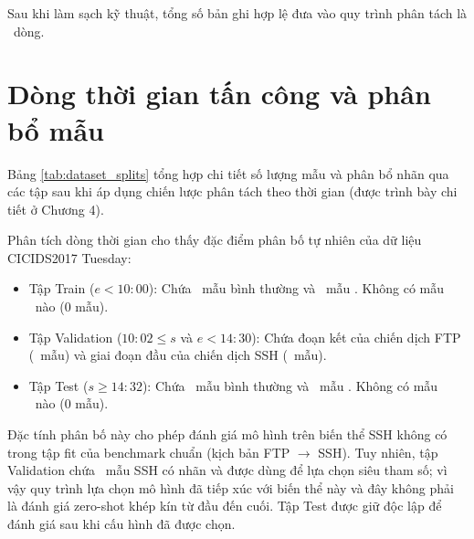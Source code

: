 Sau khi làm sạch kỹ thuật, tổng số bản ghi hợp lệ đưa vào quy trình phân tách là \DataCleanRows\ dòng.

\section{Dòng thời gian tấn công và phân bổ mẫu}

Bảng \ref{tab:dataset_splits} tổng hợp chi tiết số lượng mẫu và phân bổ nhãn qua các tập sau khi áp dụng chiến lược phân tách theo thời gian (được trình bày chi tiết ở Chương 4).



Phân tích dòng thời gian cho thấy đặc điểm phân bố tự nhiên của dữ liệu CICIDS2017 Tuesday:
\begin{itemize}
    \item Tập Train ($e < 10:00$): Chứa \DataTrainBenign\ mẫu bình thường và \DataTrainFTP\ mẫu \FTP. Không có mẫu \SSH\ nào (0 mẫu).
    \item Tập Validation ($10:02 \le s$ và $e < 14:30$): Chứa đoạn kết của chiến dịch FTP (\DataValidationFTP\ mẫu) và giai đoạn đầu của chiến dịch SSH (\DataValidationSSH\ mẫu).
    \item Tập Test ($s \ge 14:32$): Chứa \DataTestBenign\ mẫu bình thường và \DataTestSSH\ mẫu \SSH. Không có mẫu \FTP\ nào (0 mẫu).
\end{itemize}

Đặc tính phân bố này cho phép đánh giá mô hình trên biến thể SSH không có trong tập fit của benchmark chuẩn (kịch bản FTP $\to$ SSH). Tuy nhiên, tập Validation chứa \DataValidationSSH\ mẫu SSH có nhãn và được dùng để lựa chọn siêu tham số; vì vậy quy trình lựa chọn mô hình đã tiếp xúc với biến thể này và đây không phải là đánh giá zero-shot khép kín từ đầu đến cuối. Tập Test được giữ độc lập để đánh giá sau khi cấu hình đã được chọn.
